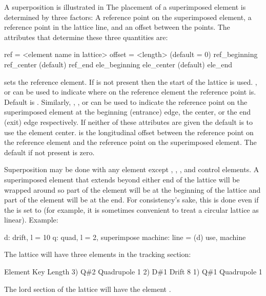 A superposition is illustrated in  The
placement of a superimposed element is determined by three factors: A
reference point on the superimposed element, a reference point in the
lattice line, and an offset between the points. The attributes that
determine these three quantities are: 
\begin{example}
  ref = <element name in lattice>
  offset = <length>      (default = 0)
  ref_beginning
  ref_center             (default)
  ref_end
  ele_beginning
  ele_center             (default)
  ele_end
\end{example}
 sets the reference element. If  is not present then
the start of the lattice is used. , 
or  can be used to indicate where on the reference element
the reference point is. Default is . Similarly,
, , or  can be used to
indicate the reference point on the superimposed element at the
beginning (entrance) edge, the center, or the end (exit) edge
respectively. If neither of these attributes are given the default is
to use the element center.  is the longitudinal offset
between the reference point on the reference element and the reference
point on the superimposed element. The default if not present is zero.

Superposition may be done with any element except ,
, , and  control elements. A
superimposed element that extends beyond either end of the lattice
will be wrapped around so part of the element will be at the beginning
of the lattice and part of the element will be at the end. For
consistency's sake, this is done even if the  is set
to  (for example, it is sometimes convenient to
treat a circular lattice as linear). Example:
\begin{example}
  d: drift, l = 10
  q: quad, l = 2, superimpose
  machine: line = (d)
  use, machine
\end{example}
The lattice will have three elements in the tracking section:
\begin{example}
        Element   Key           Length
  3)    Q{\#}2       Quadrupole    1
  2)    D{\#}1       Drift         8
  1)    Q{\#}1       Quadrupole    1
\end{example}
The lord section of the lattice will have the element . 

